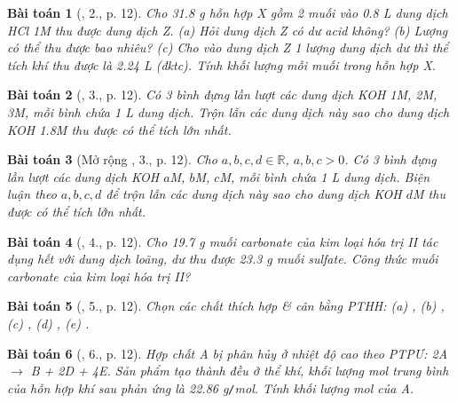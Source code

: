 \documentclass{article}
\newtheorem{baitoan}{Bài toán}
\begin{document}
\begin{baitoan}[\cite{An_400_BT_Hoa_Hoc_9}, 2., p. 12]
	Cho {\rm31.8 g} hỗn hợp X gồm 2 muối {\rm{}} vào {\rm0.8 L} dung dịch {\rm HCl 1M} thu được dung dịch Z. (a) Hỏi dung dịch Z có dư acid không? (b) Lượng {\rm{}} có thể thu được bao nhiêu? (c) Cho vào dung dịch Z 1 lượng dung dịch {\rm{}} dư thì thể tích khí {\rm{}} thu được là {\rm2.24 L} (đktc). Tính khối lượng mỗi muối trong hỗn hợp X.
\end{baitoan}

\begin{baitoan}[\cite{An_400_BT_Hoa_Hoc_9}, 3., p. 12]
	Có 3 bình đựng lần lượt các dung dịch {\rm KOH 1M, 2M, 3M}, mỗi bình chứa {\rm1 L} dung dịch. Trộn lẫn các dung dịch này sao cho dung dịch {\rm KOH 1.8M} thu được có thể tích lớn nhất.
\end{baitoan}

\begin{baitoan}[Mở rộng \cite{An_400_BT_Hoa_Hoc_9}, 3., p. 12]
	Cho $a,b,c,d\in\mathbb{R}$, $a,b,c > 0$. Có 3 bình đựng lần lượt các dung dịch {\rm KOH $a$M, $b$M, $c$M}, mỗi bình chứa {\rm1 L} dung dịch. Biện luận theo $a,b,c,d$ để trộn lẫn các dung dịch này sao cho dung dịch {\rm KOH $d$M} thu được có thể tích lớn nhất.
\end{baitoan}

\begin{baitoan}[\cite{An_400_BT_Hoa_Hoc_9}, 4., p. 12]
	Cho {\rm19.7 g} muối carbonate của kim loại hóa trị {\rm II} tác dụng hết với dung dịch {\rm{}} loãng, dư thu được {\rm23.3 g} muối sulfate. Công thức muối carbonate của kim loại hóa trị {\rm II}?
\end{baitoan}

\begin{baitoan}[\cite{An_400_BT_Hoa_Hoc_9}, 5., p. 12]
	Chọn các chất thích hợp \& cân bằng {\rm PTHH}: {\rm(a) , (b) , (c) , (d) , (e) }.
\end{baitoan}

\begin{baitoan}[\cite{An_400_BT_Hoa_Hoc_9}, 6., p. 12]
	Hợp chất A bị phân hủy ở nhiệt độ cao theo {\rm PTPƯ: 2A $\to$ B + 2D + 4E}. Sản phẩm tạo thành đều ở thể khí, khối lượng mol trung bình của hỗn hợp khí sau phản ứng là {\rm22.86 g{\tt/}mol}. Tính khối lượng mol của A.
\end{baitoan}
\end{document}
